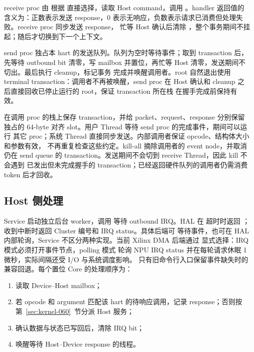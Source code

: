 \documentclass[../dayan_kernel_manual.tex]{subfiles}
\begin{document}
receive proc 由  根据  直接选择，读取 Host command，调用
。handler 返回值的含义为：正数表示发送
response，0 表示无响应，负数表示请求已消费但处理失败。receive proc 同步发送 response，
忙等 Host 确认后清除 ，整个事务期间不挂起；随后才切换到下一个上下文。

send proc 独占本 hart 的发送队列。队列为空时等待事件；取到 transaction 后，先等待
outbound bit 清零，写 mailbox 并置位，再忙等 Host 清零，发送期间不切出。最后执行 cleanup，标记事务
完成并唤醒调用者。root 自然退出使用 terminal transaction：调用者不再被唤醒，send
proc 在 Host 确认和 cleanup 之后直接回收已停止运行的 root，保证 transaction 所在栈
在握手完成前保持有效。

 在调用 proc 的栈上保存 transaction，并给 packet、request、response
分别保留独占的 64-byte 对齐 slot。用户 Thread 等待 send proc 的完成事件，期间可以运行
其它 proc；系统 Thread 直接同步发送。内部调用者保证 opcode、结构体大小和参数有效，
 不再重复检查这些约定。kill-all 摘除调用者的 event node，并取消仍在
send queue 的 transaction。发送期间不会切到 receive Thread，因此 kill 不会遇到
已发出但未完成握手的 transaction；已经返回硬件队列的调用者仍需消费 token 后才回收。

\subsection{Host 侧处理}

Service 启动独立后台 worker，调用  等待 outbound IRQ。HAL 在
超时时返回 ；收到中断时返回 Cluster 编号和 IRQ status。具体后端可
等待事件，也可在 HAL 内部轮询，Service 不区分两种实现。当前 Xilinx DMA 后端通过
 显式选择：IRQ 模式必须打开事件节点，polling 模式
轮询 NPU IRQ status 并在每轮请求休眠 1 微秒，实际间隔还受 I/O 与系统调度影响。
只有旧命令行入口保留事件缺失时的兼容回退。每个置位 Core 的处理顺序为：

\begin{enumerate}
  \item 读取 Device--Host mailbox；
  \item 若 opcode 和 argument 匹配该 hart 的待响应调用，记录 response；否则按
        第~\ref{sec:kernel-060}~节分派 Host 服务；
  \item 确认数据与状态已写回后，清除 IRQ bit；
  \item 唤醒等待 Host--Device response 的线程。
\end{enumerate}
\end{document}
